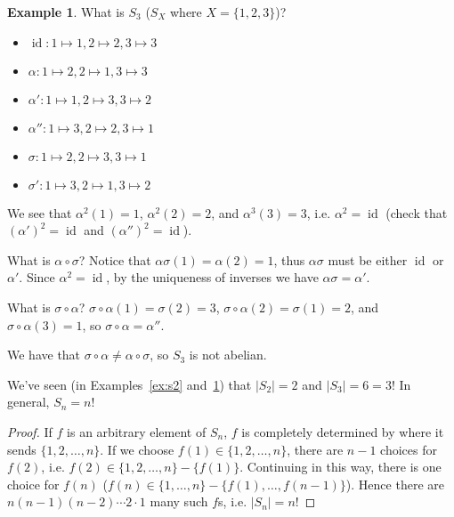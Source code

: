 \documentclass[12pt,letterpaper,DIV=11,final]{scrartcl}
\theoremstyle{plain}
\theoremstyle{definition}
\newtheorem{example}{Example}[section]
\theoremstyle{remark}
\newtheorem*{comment}{Comment}
\DeclareMathOperator{\id}{id}
\begin{document}
\begin{example}\label{ex:s3}
  What is $S_3$ ($S_X$ where $X = \{1, 2, 3\}$)?
  \begin{itemize}
    \item $\id: 1 \mapsto 1, 2 \mapsto 2, 3 \mapsto 3$
    \item $\alpha: 1 \mapsto 2, 2 \mapsto 1, 3 \mapsto 3$
    \item $\alpha': 1 \mapsto 1, 2 \mapsto 3, 3 \mapsto 2$
    \item $\alpha'': 1 \mapsto 3, 2 \mapsto 2, 3 \mapsto 1$
    \item $\sigma: 1 \mapsto 2, 2 \mapsto 3, 3 \mapsto 1$
    \item $\sigma': 1 \mapsto 3, 2 \mapsto 1, 3 \mapsto 2$
  \end{itemize}

  We see that $\alpha^2(1) = 1$, $\alpha^2(2) = 2$, and $\alpha^3(3) = 3$, i.e. $\alpha^2 = \id$ (check that ${(\alpha')}^2 = \id$ and ${(\alpha'')}^2 = \id$).

  What is $\alpha \circ \sigma$?
  Notice that $\alpha\sigma(1) = \alpha(2) = 1$, thus $\alpha\sigma$ must be either $\id$ or $\alpha'$.
  Since $\alpha^2 = \id$, by the uniqueness of inverses we have $\alpha \sigma = \alpha'$.

  What is $\sigma \circ \alpha$?
  $\sigma \circ \alpha(1) = \sigma(2) = 3$, $\sigma \circ \alpha(2) = \sigma(1) = 2$, and $\sigma \circ \alpha(3) = 1$, so $\sigma \circ \alpha = \alpha''$.

  We have that $\sigma \circ \alpha \neq \alpha \circ \sigma$, so $S_3$ is not abelian.
\end{example}

We've seen (in Examples~\ref{ex:s2} and~\ref{ex:s3}) that $|S_2| = 2$ and $|S_3| = 6 = 3!$
In general, $S_n = n!$

\begin{proof}
  If $f$ is an arbitrary element of $S_n$, $f$ is completely determined by where it sends $\{1, 2, \dots, n\}$.
  If we choose $f(1) \in \{1, 2, \dots, n\}$, there are $n - 1$ choices for $f(2)$, i.e. $f(2) \in \{1, 2, \dots, n\} - \{f(1)\}$.
  Continuing in this way, there is one choice for $f(n)$ ($f(n) \in \{1, \dots, n\} - \{f(1), \dots, f(n - 1)\}$).
  Hence there are $n (n - 1) (n - 2) \cdots 2 \cdot 1$ many such $f$s, i.e. $|S_n| = n!$
\end{proof}

\begin{comment}
  There is a natural function $i : S_n \to S_{n + 1}$. For $f \in S_n$, $i(f)(k) \equiv f(k)$ for $1 \leq k \leq n$, and $i(f)(n + 1) \equiv n + 1$.
  In particular, $i(S_3) = S_4, i(S_4) = S_5, \dots$, which suggests $S_n$ is not abelian for $n \geq 3$ (since $S_3$ is not abelian).
\end{comment}
\end{document}
